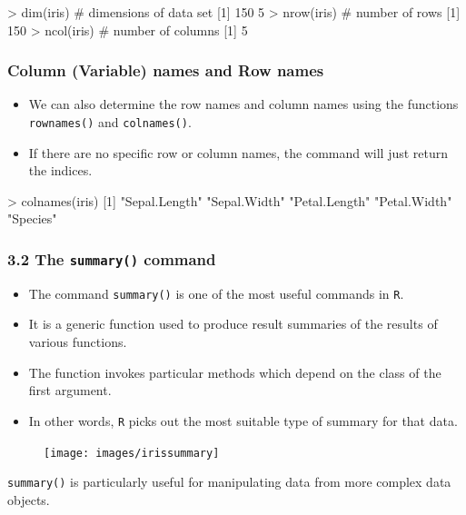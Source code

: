  
 \begin{framed}
 \begin{semiverbatim}
 > dim(iris) # dimensions of data set
 [1] 150 5
 > nrow(iris) # number of rows
 [1] 150
 > ncol(iris) # number of columns
 [1] 5
 \end{semiverbatim}
 \end{framed}
 
 
 
 \frametitle{Column (Variable) names and Row names}
 \begin{itemize}
 \item We can also determine the row names and column names using the functions \texttt{rownames()}
 and \texttt{colnames()}. 
 \item If there are no specific row or column names, the command will just return
 the indices.
 \end{itemize}
 \begin{semiverbatim}
 > colnames(iris)
 [1] "Sepal.Length" "Sepal.Width" "Petal.Length" "Petal.Width" "Species"
 \end{semiverbatim}
 
 
 \frametitle{3.2 The \texttt{summary()} command}
 \begin{itemize}
 \item The command \texttt{summary()} is one of the most useful commands in \texttt{R}. 
 \item It is a generic function used
 to produce result summaries of the results of various functions. 
 \item The function invokes particular
 methods which depend on the class of the first argument. 
 \item In other words, \texttt{R} picks out the most
 suitable type of summary for that data.
 \end{itemize}
 
 
 
 
 \begin{figure}
 \centering
 \texttt{[image: images/irissummary]}
 
 \end{figure}
 \texttt{summary()} is particularly useful for manipulating data from more complex data objects.
 
